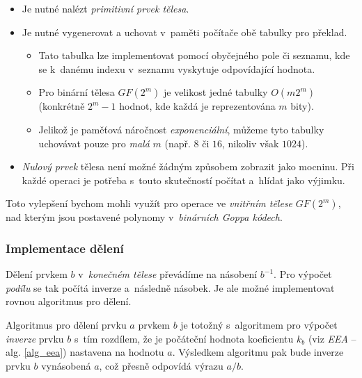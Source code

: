 \documentclass[thesis=M,czech,hidelinks]{FITthesis}[2012/06/26]
\newcommand{\0}{{\textcolor[gray]{0.75}{0}}}
\begin{document}
\begin{itemize}
    \item Je nutné nalézt \emph{primitivní prvek tělesa}.

    \item Je nutné vygenerovat a uchovat v~paměti počítače obě tabulky pro
        překlad.
        \begin{itemize}
            \item Tato tabulka lze implementovat pomocí obyčejného pole či
                sezna\-mu, kde se k~danému indexu v~seznamu vyskytuje
                odpovídající hodnota.
            \item Pro binární  tělesa $GF(2^m)$ je velikost jedné tabulky
                $O(m 2^m)$ (konkrétně $2^m - 1$ hodnot, kde každá je
                reprezentována $m$ bity).
            \item Jelikož je paměťová náročnost \emph{exponenciální}, můžeme
                tyto tabulky uchovávat pouze pro \emph{malá} $m$ (např. $8$ či
                $16$, nikoliv však $1024$).
        \end{itemize}

    \item \emph{Nulový prvek} tělesa není možné žádným způsobem zobrazit jako
        mocninu. Při každé operaci je potřeba s~touto skutečností počítat
        a~hlídat jako výjimku.

\end{itemize}

Toto vylepšení bychom mohli využít pro operace ve \emph{vnitřním tělese}
$GF(2^m)$, nad kterým jsou postavené polynomy v~\emph{binárních Goppa kódech}.


\subsubsection{Implementace dělení}

Dělení prvkem $b$ v~\emph{konečném tělese} převádíme na násobení $b^{-1}$. Pro
výpočet \emph{podílu} se tak počítá inverze a~následně násobek. Je ale možné
implementovat rovnou algoritmus pro dělení.

Algoritmus pro dělení prvku $a$ prvkem $b$ je totožný s~algoritmem pro výpočet
\emph{inverze} prvku $b$ s~tím rozdílem, že je počáteční hodnota koeficientu
$k_b$ (viz \emph{EEA} -- alg. \ref{alg_eea}) nastavena na hodnotu $a$.
%
Výsledkem algoritmu pak bude inverze prvku $b$ vynásobená $a$, což přesně
odpovídá výrazu $a/b$.
\end{document}
